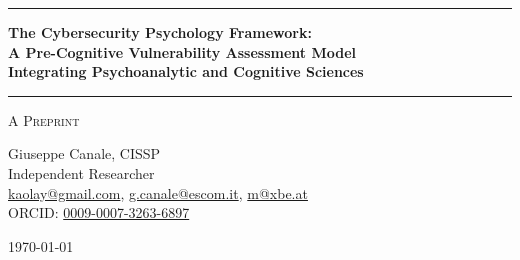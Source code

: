 \documentclass[11pt,a4paper]{article}
\begin{document}
\thispagestyle{empty}
\begin{center}

\vspace*{0.5cm}

\rule{\textwidth}{1.5pt}

\vspace{0.5cm}

{\LARGE \textbf{The Cybersecurity Psychology Framework:}}\\[0.3cm]
{\LARGE \textbf{A Pre-Cognitive Vulnerability Assessment Model}}\\[0.3cm]
{\LARGE \textbf{Integrating Psychoanalytic and Cognitive Sciences}}

\vspace{0.5cm}

\rule{\textwidth}{1.5pt}

\vspace{0.3cm}

{\large \textsc{A Preprint}}

\vspace{0.5cm}

{\Large Giuseppe Canale, CISSP}\\[0.2cm]
Independent Researcher\\[0.1cm]
\href{mailto:kaolay@gmail.com}{kaolay@gmail.com}, 
\href{mailto:g.canale@escom.it}{g.canale@escom.it}, 
\href{mailto:m8xbe.at}{m@xbe.at}\\[0.1cm]
ORCID: \href{https://orcid.org/0009-0007-3263-6897}{0009-0007-3263-6897}

\vspace{0.8cm}

{\large \today}

\vspace{1cm}

\end{center}
\end{document}

